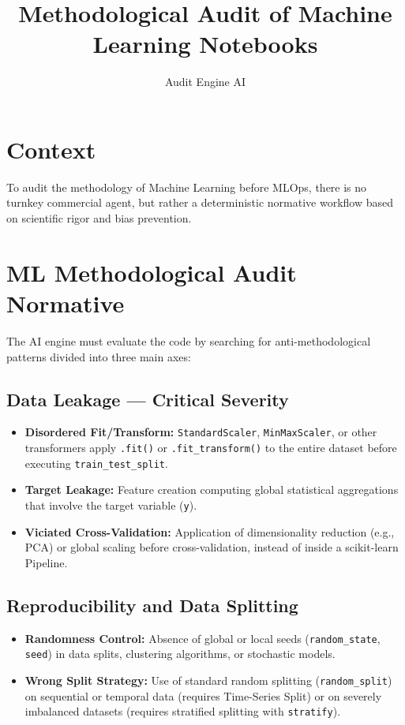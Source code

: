 \documentclass[11pt,a4paper]{article}
\title{Methodological Audit of Machine Learning Notebooks}
\author{Audit Engine AI}
\date{}
\begin{document}
\maketitle

\section{Context}

To audit the methodology of Machine Learning before MLOps, there is no turnkey commercial agent, but rather a deterministic normative workflow based on scientific rigor and bias prevention.

\section{ML Methodological Audit Normative}

The AI engine must evaluate the code by searching for anti-methodological patterns divided into three main axes:

\subsection{Data Leakage --- Critical Severity}

\begin{itemize}
  \item \textbf{Disordered Fit/Transform:} \texttt{StandardScaler}, \texttt{MinMaxScaler}, or other transformers apply \texttt{.fit()} or \texttt{.fit\_transform()} to the entire dataset before executing \texttt{train\_test\_split}.
  \item \textbf{Target Leakage:} Feature creation computing global statistical aggregations that involve the target variable (\texttt{y}).
  \item \textbf{Viciated Cross-Validation:} Application of dimensionality reduction (e.g., PCA) or global scaling before cross-validation, instead of inside a scikit-learn Pipeline.
\end{itemize}

\subsection{Reproducibility and Data Splitting}

\begin{itemize}
  \item \textbf{Randomness Control:} Absence of global or local seeds (\texttt{random\_state}, \texttt{seed}) in data splits, clustering algorithms, or stochastic models.
  \item \textbf{Wrong Split Strategy:} Use of standard random splitting (\texttt{random\_split}) on sequential or temporal data (requires Time-Series Split) or on severely imbalanced datasets (requires stratified splitting with \texttt{stratify}).
\end{itemize}
\end{document}
